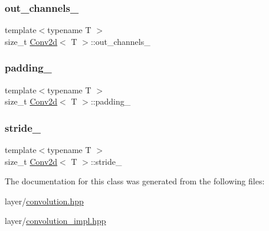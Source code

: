 \mbox{\label{class_conv2d_a48b99a4dee42c4d4221eddedccceffba}} 
\subsubsection{\texorpdfstring{out\_channels\_}{out\_channels\_}}
{\footnotesize\ttfamily template$<$typename T $>$ \\
size\+\_\+t \mbox{\hyperlink{class_conv2d}{Conv2d}}$<$ T $>$\+::out\+\_\+channels\+\_\+\hspace{0.3cm}{\ttfamily [protected]}}

\mbox{\label{class_conv2d_a8e548b8a5c0efaf494b819523951b558}} 
\subsubsection{\texorpdfstring{padding\_}{padding\_}}
{\footnotesize\ttfamily template$<$typename T $>$ \\
size\+\_\+t \mbox{\hyperlink{class_conv2d}{Conv2d}}$<$ T $>$\+::padding\+\_\+\hspace{0.3cm}{\ttfamily [protected]}}

\mbox{\label{class_conv2d_a95a69ad326bc6279247163d50f332b3d}} 
\subsubsection{\texorpdfstring{stride\_}{stride\_}}
{\footnotesize\ttfamily template$<$typename T $>$ \\
size\+\_\+t \mbox{\hyperlink{class_conv2d}{Conv2d}}$<$ T $>$\+::stride\+\_\+\hspace{0.3cm}{\ttfamily [protected]}}



The documentation for this class was generated from the following files\+:\begin{DoxyCompactItemize}
\item 
layer/\mbox{\hyperlink{convolution_8hpp}{convolution.\+hpp}}\item 
layer/\mbox{\hyperlink{convolution__impl_8hpp}{convolution\+\_\+impl.\+hpp}}\end{DoxyCompactItemize}
